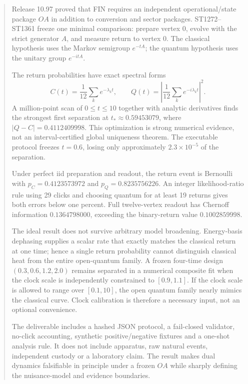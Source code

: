 \documentclass[11pt,a4paper]{article}
\begin{document}
\begin{abstract}
Release 10.97 proved that FIN requires an independent operational/state package
$OA$ in addition to conversion and sector packages.  ST1272--ST1361 freeze one
minimal comparison: prepare vertex $0$, evolve with the strict generator $A$,
and measure return to vertex $0$.  The classical hypothesis uses the Markov
semigroup $e^{-tA}$; the quantum hypothesis uses the unitary group $e^{-itA}$.

The return probabilities have exact spectral forms
\[
 C(t)=\frac1{12}\sum_k e^{-\lambda_kt},\qquad
 Q(t)=\left|\frac1{12}\sum_k e^{-i\lambda_kt}\right|^2.
\]
A million-point scan of $0\le t\le10$ together with analytic derivatives finds
the strongest first separation at
$t_*\approx0.59453079$, where
$|Q-C|=0.4112409998$.  This optimization is strong numerical evidence, not an
interval-certified global uniqueness theorem.  The executable protocol freezes
$t=0.6$, losing only approximately $2.3\times10^{-5}$ of the separation.

Under perfect iid preparation and readout, the return event is Bernoulli with
$p_C=0.4123573972$ and $p_Q=0.8235756226$.  An integer likelihood-ratio rule
using 29 clicks and choosing quantum for at least 19 returns gives both errors
below one percent.  Full twelve-vertex readout has Chernoff information
$0.1364798000$, exceeding the binary-return value $0.1002859998$.

The ideal result does not survive arbitrary model broadening.  Energy-basis
dephasing supplies a scalar rate that exactly matches the classical return at
one time; hence a single return probability cannot distinguish classical heat
from the entire open-quantum family.  A frozen four-time design
$(0.3,0.6,1.2,2.0)$ remains separated in a numerical composite fit when the
clock scale is independently constrained to $[0.9,1.1]$.  If the clock scale
is allowed to range over $[0.1,10]$, the open quantum family nearly mimics the
classical curve.  Clock calibration is therefore a necessary input, not an
optional convenience.

The deliverable includes a hashed JSON protocol, a fail-closed validator,
no-click accounting, synthetic positive/negative fixtures and a one-shot
analysis rule.  It does not include apparatus, raw natural events, independent
custody or a laboratory claim.  The result makes dual dynamics falsifiable in
principle under a frozen $OA$ while sharply defining the nuisance-model and
evidence boundaries.
\end{abstract}
\end{document}
